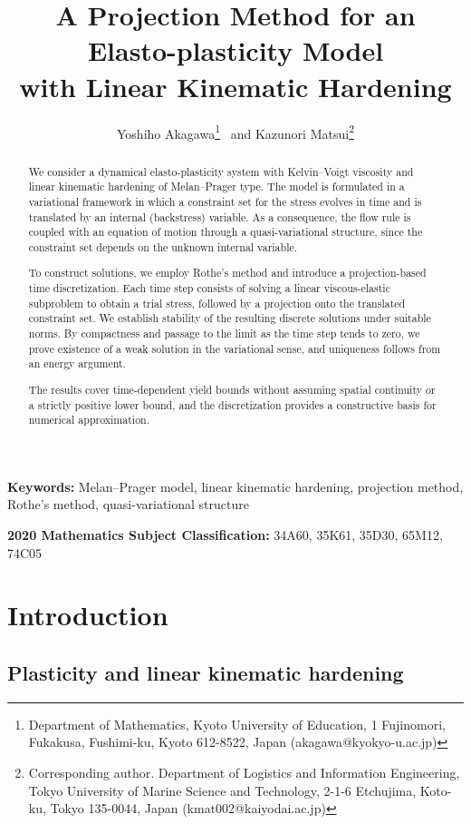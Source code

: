 \documentclass[11pt, a4paper]{article}
\title{
A Projection Method for an Elasto-plasticity Model \\with Linear Kinematic Hardening}
\author{
    Yoshiho Akagawa\thanks{Department of Mathematics, Kyoto University of Education, 1 Fujinomori, Fukakusa, Fushimi-ku, Kyoto 612-8522, Japan (akagawa@kyokyo-u.ac.jp)}
    ~and 
    Kazunori Matsui\thanks{Corresponding author. Department of Logistics and Information Engineering, Tokyo University of Marine Science and Technology, 2-1-6 Etchujima, Koto-ku, Tokyo 135-0044, Japan (kmat002@kaiyodai.ac.jp)}
}
\date{}
\providecommand{\keywords}[1]
{
  \small	
  \textbf{Keywords: } #1
}
\providecommand{\MSC}[1]
{
  \small	
  \textbf{2020 Mathematics Subject Classification: } #1
}
\begin{document}
    
\maketitle

\begin{abstract}

    We consider a dynamical elasto-plasticity system with Kelvin--Voigt viscosity and linear kinematic hardening of Melan--Prager type.
    The model is formulated in a variational framework in which a constraint set for the stress evolves in time and is translated by an internal (backstress) variable.
    As a consequence, the flow rule is coupled with an equation of motion through a quasi-variational structure, since the constraint set depends on the unknown internal variable.

    To construct solutions, we employ Rothe's method and introduce a projection-based time discretization.
    Each time step consists of solving a linear viscous-elastic subproblem to obtain a trial stress, followed by a projection onto the translated constraint set.
    We establish stability of the resulting discrete solutions under suitable norms.
    By compactness and passage to the limit as the time step tends to zero, we prove existence of a weak solution in the variational sense, and uniqueness follows from an energy argument.

    The results cover time-dependent yield bounds without assuming spatial continuity or a strictly positive lower bound, and the discretization provides a constructive basis for numerical approximation.
\end{abstract}

\keywords{Melan--Prager model, linear kinematic hardening, projection method, Rothe's method, quasi-variational structure}

\MSC{34A60, 35K61, 35D30, 65M12, 74C05}

\section{Introduction}
\label{sec:intro}

\subsection{Plasticity and linear kinematic hardening}
\end{document}
